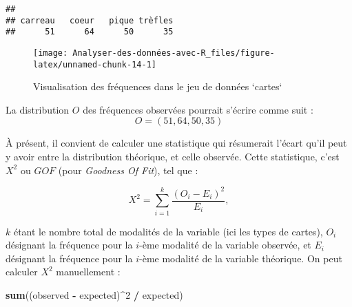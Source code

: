 \documentclass[
  french,
]{book}
\newenvironment{Shaded}{\begin{snugshade}}{\end{snugshade}}
\newcommand{\CommentTok}[1]{\textcolor[rgb]{0.56,0.35,0.01}{\textit{#1}}}
\newcommand{\DataTypeTok}[1]{\textcolor[rgb]{0.13,0.29,0.53}{#1}}
\newcommand{\DecValTok}[1]{\textcolor[rgb]{0.00,0.00,0.81}{#1}}
\newcommand{\KeywordTok}[1]{\textcolor[rgb]{0.13,0.29,0.53}{\textbf{#1}}}
\newcommand{\NormalTok}[1]{#1}
\newcommand{\OperatorTok}[1]{\textcolor[rgb]{0.81,0.36,0.00}{\textbf{#1}}}
\newcommand{\StringTok}[1]{\textcolor[rgb]{0.31,0.60,0.02}{#1}}
\begin{document}
\begin{verbatim}
## 
## carreau   coeur   pique trèfles 
##      51      64      50      35
\end{verbatim}

\begin{Shaded}
\end{Shaded}

\begin{figure}

{\centering \texttt{[image: Analyser-des-données-avec-R\_files/figure-latex/unnamed-chunk-14-1]} 

}

\caption{Visualisation des fréquences dans le jeu de données `cartes`}\label{fig:unnamed-chunk-14}
\end{figure}

La distribution \(O\) des fréquences observées pourrait s'écrire comme suit :
\[O = (51, 64, 50, 35)\]

À présent, il convient de calculer une statistique qui résumerait l'écart qu'il peut y avoir entre la distribution théorique, et celle observée. Cette statistique, c'est \(X^2\) ou \(GOF\) (pour \emph{Goodness Of Fit}), tel que :

\[X^2 = \sum_{i=1}^{k} \frac{(O_{i} - E_{i})^2}{E_{i}},\]

\(k\) étant le nombre total de modalités de la variable (ici les types de cartes), \(O_{i}\) désignant la fréquence pour la \(i\)-ème modalité de la variable observée, et \(E_{i}\) désignant la fréquence pour la \(i\)-ème modalité de la variable théorique. On peut calculer \(X^2\) manuellement :

\begin{Shaded}
\begin{Highlighting}[]
\KeywordTok{sum}\NormalTok{((observed }\OperatorTok{-}\StringTok{ }\NormalTok{expected)}\OperatorTok{^}\DecValTok{2} \OperatorTok{/}\StringTok{ }\NormalTok{expected)}
\end{Highlighting}
\end{Shaded}
\end{document}
